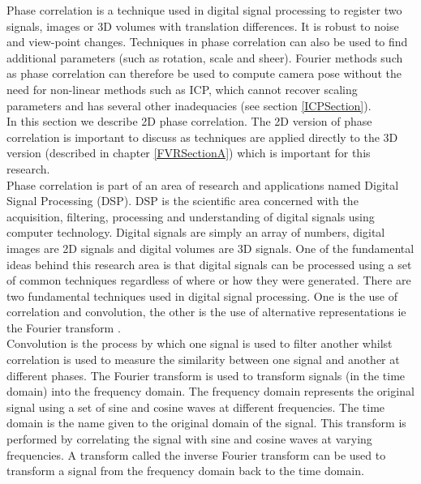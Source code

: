Phase correlation is a technique used in digital signal processing to register two signals, images or 3D volumes with translation differences. It is robust to noise and view-point changes. Techniques in phase correlation can also be used to find additional parameters (such as rotation, scale and sheer). Fourier methods such as phase correlation can therefore be used to compute camera pose without the need for non-linear methods such as ICP, which cannot recover scaling parameters and has several other inadequacies (see section \ref{ICPSection}). \\ 

In this section we describe 2D phase correlation. The 2D version of phase correlation is important to discuss as techniques are applied directly to the 3D version (described in chapter \ref{FVRSectionA}) which is important for this research. \\

Phase correlation is part of an area of research and applications named Digital Signal Processing (DSP). DSP is the scientific area concerned with the acquisition, filtering, processing and understanding of digital signals using computer technology. Digital signals are simply an array of numbers, digital images are 2D signals and digital volumes are 3D signals. One of the fundamental ideas behind this research area is that digital signals can be processed using a set of common techniques regardless of where or how they were generated. There are two fundamental techniques used in digital signal processing. One is the use of correlation and convolution, the other is the use of alternative representations ie the Fourier transform \cite{Smith97Scientist}. \\

Convolution is the process by which one signal is used to filter another whilst correlation is used to measure the similarity between one signal and another at different phases. The Fourier transform is used to transform signals (in the time domain) into the frequency domain. The frequency domain represents the original signal using a set of sine and cosine waves at different frequencies. The time domain is the name given to the original domain of the signal. This transform is performed by correlating the signal with sine and cosine waves at varying frequencies. A transform called the inverse Fourier transform can be used to transform a signal from the frequency domain back to the time domain. \\

